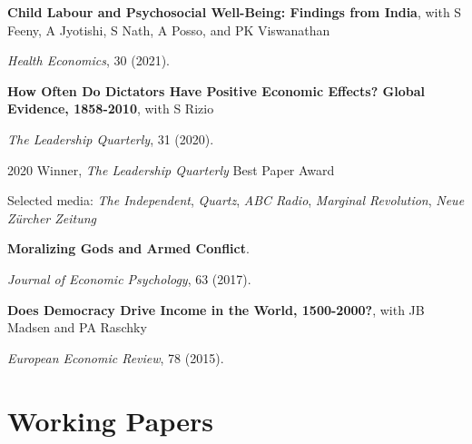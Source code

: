 \documentclass[letterpaper]{article}
\renewenvironment{itemize}{
  \begin{list}{}{
    \setlength{\leftmargin}{1.5em}
  }
}{
  \end{list}
}
\begin{document}
\begin{itemize}
\medskip

\item \textbf{Child Labour and Psychosocial Well-Being: Findings from India}, with S Feeny, A Jyotishi, S Nath, A Posso, and PK Viswanathan
\vspace{-0.05in}
\item \textit{Health Economics}, 30 (2021).

\medskip

\item \textbf{How Often Do Dictators Have Positive Economic Effects? Global Evidence, 1858-2010}, with S Rizio
\vspace{-0.05in}
\item \textit{The Leadership Quarterly}, 31 (2020).
\begin{itemize}
\item 2020 Winner, \textit{The Leadership Quarterly} Best Paper Award
\vspace{-0.05in}
\item Selected media: \textit{The Independent}, \textit{Quartz}, \textit{ABC Radio}, \textit{Marginal Revolution}, \textit{Neue Zürcher Zeitung}
\end{itemize}

\medskip

\item \textbf{Moralizing Gods and Armed Conflict}.
\vspace{-0.05in}
\item \textit{Journal of Economic Psychology}, 63 (2017).

\medskip

\item \textbf{Does Democracy Drive Income in the World, 1500-2000?}, with JB Madsen and PA Raschky
\vspace{-0.05in}
\item \textit{European Economic Review}, 78 (2015).

\end{itemize}




\section*{Working Papers}
\end{document}
